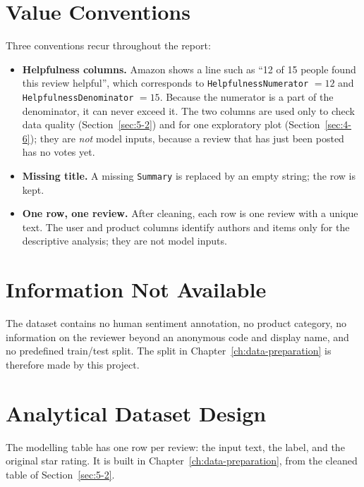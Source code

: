 \section{Value Conventions}
\label{sec:3-5}

Three conventions recur throughout the report:

\begin{itemize}
    \item \textbf{Helpfulness columns.} Amazon shows a line such as ``12 of 15 people found this review helpful'', which corresponds to \texttt{HelpfulnessNumerator} $=12$ and \texttt{HelpfulnessDenominator} $=15$. Because the numerator is a part of the denominator, it can never exceed it. The two columns are used only to check data quality (Section~\ref{sec:5-2}) and for one exploratory plot (Section~\ref{sec:4-6}); they are \emph{not} model inputs, because a review that has just been posted has no votes yet.
    \item \textbf{Missing title.} A missing \texttt{Summary} is replaced by an empty string; the row is kept.
    \item \textbf{One row, one review.} After cleaning, each row is one review with a unique text. The user and product columns identify authors and items only for the descriptive analysis; they are not model inputs.
\end{itemize}

\section{Information Not Available}
\label{sec:3-6}

The dataset contains no human sentiment annotation, no product category, no information on the reviewer beyond an anonymous code and display name, and no predefined train/test split. The split in Chapter~\ref{ch:data-preparation} is therefore made by this project.

\section{Analytical Dataset Design}
\label{sec:3-7}

The modelling table has one row per review: the input text, the label, and the original star rating. It is built in Chapter~\ref{ch:data-preparation}, from the cleaned table of Section~\ref{sec:5-2}.
